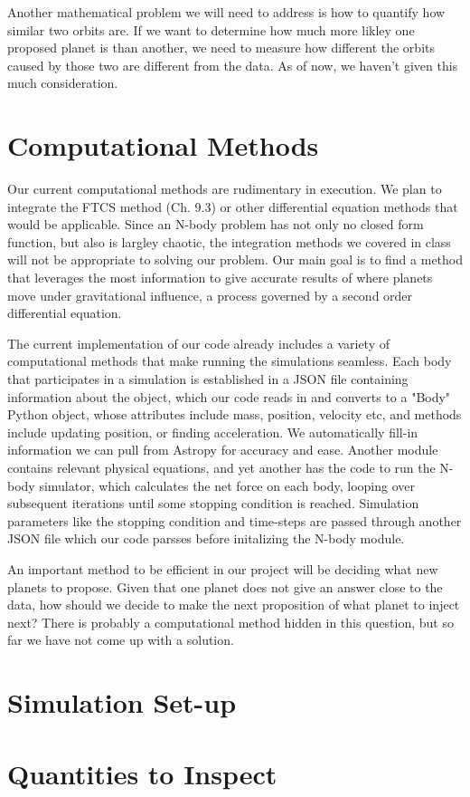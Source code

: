 \documentclass[a4paper,12pt]{article} %
\numberwithin{equation}{section} %
\numberwithin{figure}{section} %
\begin{document}
Another mathematical problem we will need to address is how to quantify how similar two orbits are. If we want to determine how much more likley one proposed planet is than another, we need to measure how different the orbits caused by those two are different from the data. As of now, we haven't given this much consideration.

\section{Computational Methods}


Our current computational methods are rudimentary in execution. We plan to integrate the FTCS method (Ch. 9.3) or other differential equation methods that would be applicable. Since an N-body problem has not only no closed form function, but also is largley chaotic, the integration methods we covered in class will not be appropriate to solving our problem. Our main goal is to find a method that leverages the most information to give accurate results of where planets move under gravitational influence, a process governed by a second order differential equation.
\par
The current implementation of our code already includes a variety of computational methods that make running the simulations seamless.
Each body that participates in a simulation is established in a JSON file containing information about the object, which our code reads in and converts to a "Body" Python object, whose attributes include mass, position, velocity etc, and methods include updating position, or finding acceleration. We automatically fill-in information we can pull from Astropy for accuracy and ease. Another module contains relevant physical equations, and yet another has the code to run the N-body simulator, which calculates the net force on each body, looping over subsequent iterations until some stopping condition is reached. Simulation parameters like the stopping condition and time-steps are passed through another JSON file which our code parsses before initalizing the N-body module.
\par
An important method to be efficient in our project will be deciding what new planets to propose. Given that one planet does not give an answer close to the data, how should we decide to make the next proposition of what planet to inject next? There is probably a computational method hidden in this question, but so far we have not come up with a solution.



\section{Simulation Set-up}



\section{Quantities to Inspect}



\end{document}
